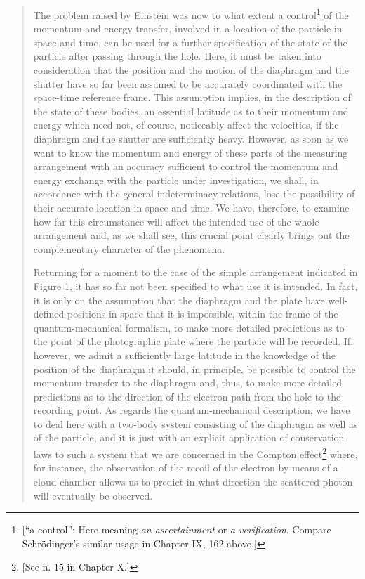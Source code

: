 \documentclass[11pt]{memoir}
\begin{document}
\begin{quote}
The problem raised by Einstein was now to what extent a
control\footnote{{[}``a control'': Here meaning \emph{an ascertainment}
  or \emph{a verification}. Compare Schrödinger's similar usage in
  Chapter IX, 162 above.{]}} of the momentum and energy transfer,
involved in a location of the particle in space and time, can be used
for a further specification of the state of the particle after passing
through the hole. Here, it must be taken into consideration that the
position and the motion of the diaphragm and the shutter have so far
been assumed to be accurately coordinated with the space-time reference
frame. This assumption implies, in the description of the state of these
bodies, an essential latitude as to their momentum and energy which need
not, of course, noticeably affect the velocities, if the diaphragm and
the shutter are sufficiently heavy. However, as soon as we want to know
the momentum and energy of these parts of the measuring arrangement with
an accuracy sufficient to control the momentum and energy exchange with
the particle under investigation, we shall, in accordance with the
general indeterminacy relations, lose the possibility of their accurate
location in space and time. We have, therefore, to examine how far this
circumstance will affect the intended use of the whole arrangement and,
as we shall see, this crucial point clearly brings out the complementary
character of the phenomena.

Returning for a moment to the case of the simple arrangement indicated
in Figure 1, it has so far not been specified to what use it is
intended. In fact, it is only on the assumption that the diaphragm and
the plate have well-defined positions in space that it is impossible,
within the frame of the quantum-mechanical formalism, to make more
detailed predictions as to the point of the photographic plate where the
particle will be recorded. If, however, we admit a sufficiently large
latitude in the knowledge of the position of the diaphragm it should, in
principle, be possible to control the momentum transfer to the diaphragm
and, thus, to make more detailed predictions as to the direction of the
electron path from the hole to the recording point. As regards the
quantum-mechanical description, we have to deal here with a two-body
system consisting of the diaphragm as well as of the particle, and it is
just with an explicit application of conservation laws to such a system
that we are concerned in the Compton effect\footnote{{[}See n. 15 in
  Chapter X.{]}} where, for instance, the observation of the recoil of
the electron by means of a cloud chamber allows us to predict in what
direction the scattered photon will eventually be observed.


\end{quote}
\end{document}
